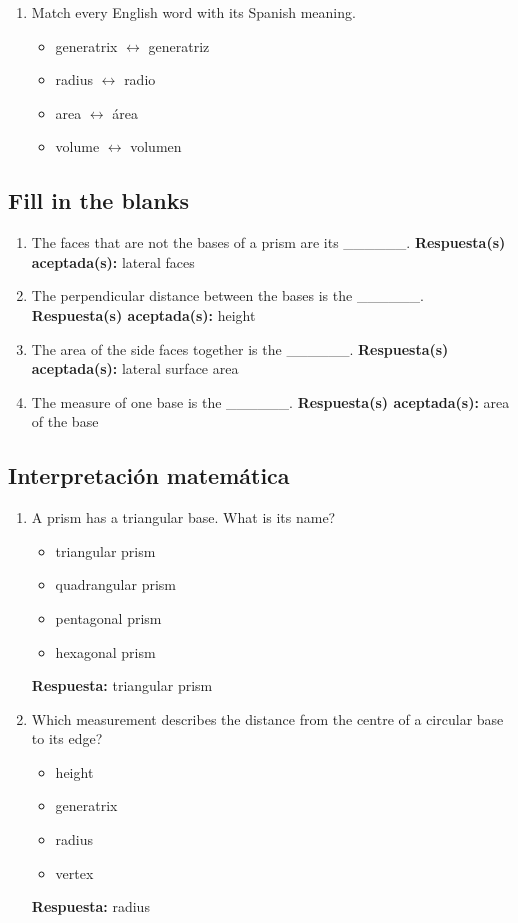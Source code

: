 \documentclass[11pt,a4paper]{article}
\begin{document}
\begin{enumerate}
\begin{itemize}
\item solid of revolution $\longleftrightarrow$ cuerpo de revolución
\item cylinder $\longleftrightarrow$ cilindro
\item cone $\longleftrightarrow$ cono
\item axis of revolution $\longleftrightarrow$ eje de revolución
\end{itemize}
\item Match every English word with its Spanish meaning.
\begin{itemize}
\item generatrix $\longleftrightarrow$ generatriz
\item radius $\longleftrightarrow$ radio
\item area $\longleftrightarrow$ área
\item volume $\longleftrightarrow$ volumen
\end{itemize}
\end{enumerate}
\subsection{Fill in the blanks}
\begin{enumerate}
\item The faces that are not the bases of a prism are its \_\_\_\_\_\_.
\textbf{Respuesta(s) aceptada(s):} lateral faces
\item The perpendicular distance between the bases is the \_\_\_\_\_\_.
\textbf{Respuesta(s) aceptada(s):} height
\item The area of the side faces together is the \_\_\_\_\_\_.
\textbf{Respuesta(s) aceptada(s):} lateral surface area
\item The measure of one base is the \_\_\_\_\_\_.
\textbf{Respuesta(s) aceptada(s):} area of the base
\end{enumerate}
\subsection{Interpretaci\'on matem\'atica}
\begin{enumerate}
\item A prism has a triangular base. What is its name?
\begin{itemize}
\item triangular prism
\item quadrangular prism
\item pentagonal prism
\item hexagonal prism
\end{itemize}
\textbf{Respuesta:} triangular prism
\item Which measurement describes the distance from the centre of a circular base to its edge?
\begin{itemize}
\item height
\item generatrix
\item radius
\item vertex
\end{itemize}
\textbf{Respuesta:} radius
\end{enumerate}
\end{document}
